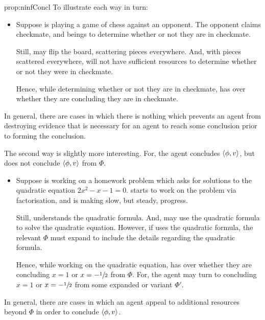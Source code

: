 \begin{note}
\begin{argument}{prop:ninfConcl}
    To illustrate each way in turn:

    \begin{itemize}
    \item
      Suppose \vAgent{} is playing a game of chess against an opponent.
      The opponent claims checkmate, and \vAgent{} beings to determine whether or not they are in checkmate.

      Still, \vAgent{} may flip the board, scattering pieces everywhere.
      And, with pieces scattered everywhere, \vAgent{} will not have sufficient resources to determine whether or not they were in checkmate.

      Hence, while determining whether or not they are in checkmate, \vAgent{} has \ninf{} over whether they are concluding they are in checkmate.
    \end{itemize}

    In general, there are cases in which there is nothing which prevents an agent from destroying evidence that is necessary for an agent to reach some conclusion prior to forming the conclusion.

    The second way is slightly more interesting.
    For, the agent concludes \(\langle \phi, v \rangle\), but does not conclude \(\langle \phi, v \rangle\) from \(\Phi\).

    \begin{itemize}
    \item
      Suppose \vAgent{} is working on a homework problem which asks for solutions to the quadratic equation \(2x^{2} - x - 1 = 0\).
      \vAgent{} starts to work on the problem via factorisation, and is making slow, but steady, progress.

      Still, \vAgent{} understands the quadratic formula.
      And, \vAgent{} may use the quadratic formula to solve the quadratic equation.
      However, if \vAgent{} uses the quadratic formula, the relevant \poP{} \(\Phi\) must expand to include the details regarding the quadratic formula.

      Hence, while working on the quadratic equation, \vAgent{} has \ninf{} over whether they are concluding \(x = 1\) or \(x = -\sfrac{1}{2}\) from \(\Phi\).
      For, the agent may turn to concluding \(x = 1\) or \(x = -\sfrac{1}{2}\) from some expanded or variant \poP{} \(\Phi'\).
    \end{itemize}

    In general, there are cases in which an agent appeal to additional resources beyond \(\Phi\) in order to conclude \(\langle \phi, v \rangle\).
  \end{argument}
\end{note}

